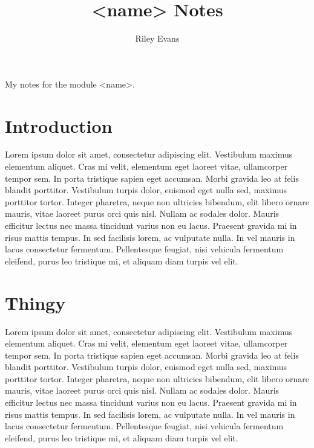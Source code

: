\documentclass{article}
\title{<name> Notes}
\author{Riley Evans}
\date{\the\year}
\begin{document}
\secfont
\maketitle
\normalfont
\begin{center}
My notes for the module <name>. 
\end{center}




\section*{Introduction}
Lorem ipsum dolor sit amet, consectetur adipiscing elit. Vestibulum maximus elementum aliquet. Cras mi velit, elementum eget laoreet vitae, ullamcorper tempor sem. In porta tristique sapien eget accumsan. Morbi gravida leo at felis blandit porttitor. Vestibulum turpis dolor, euismod eget nulla sed, maximus porttitor tortor. Integer pharetra, neque non ultricies bibendum, elit libero ornare mauris, vitae laoreet purus orci quis nisl. Nullam ac sodales dolor. Mauris efficitur lectus nec massa tincidunt varius non eu lacus. Praesent gravida mi in risus mattis tempus. In sed facilisis lorem, ac vulputate nulla. In vel mauris in lacus consectetur fermentum. Pellentesque feugiat, nisi vehicula fermentum eleifend, purus leo tristique mi, et aliquam diam turpis vel elit.
\newpage


\tableofcontents
\newpage

\section{Thingy}
Lorem ipsum dolor sit amet, consectetur adipiscing elit. Vestibulum maximus elementum aliquet. Cras mi velit, elementum eget laoreet vitae, ullamcorper tempor sem. In porta tristique sapien eget accumsan. Morbi gravida leo at felis blandit porttitor. Vestibulum turpis dolor, euismod eget nulla sed, maximus porttitor tortor. Integer pharetra, neque non ultricies bibendum, elit libero ornare mauris, vitae laoreet purus orci quis nisl. Nullam ac sodales dolor. Mauris efficitur lectus nec massa tincidunt varius non eu lacus. Praesent gravida mi in risus mattis tempus. In sed facilisis lorem, ac vulputate nulla. In vel mauris in lacus consectetur fermentum. Pellentesque feugiat, nisi vehicula fermentum eleifend, purus leo tristique mi, et aliquam diam turpis vel elit.
\end{document}
